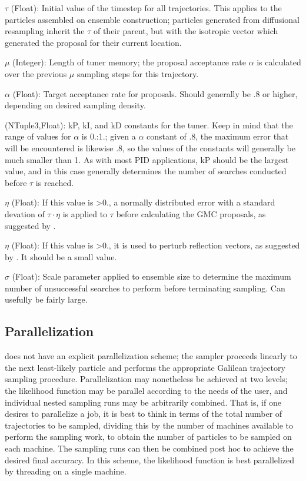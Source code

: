 $\tau$ (Float): Initial value of the timestep for all trajectories. This applies to the particles assembled on ensemble construction; particles generated from diffusional resampling inherit the $\tau$ of their parent, but with the isotropic vector which generated the proposal for their current location.

$\mu$ (Integer): Length of tuner memory; the proposal acceptance rate $\alpha$ is calculated over the previous $\mu$ sampling steps for this trajectory.

$\alpha$ (Float): Target acceptance rate for proposals. Should generally be .8 or higher, depending on desired sampling density.

 (NTuple{3,Float}): kP, kI, and kD constants for the tuner. Keep in  mind that the range of values for $\alpha$ is 0.:1.; given a $\alpha$ constant of .8, the maximum error that will be encountered is likewise .8, so the values of the constants will generally be much smaller than 1. As with most PID applications, kP should be the largest value, and in this case generally determines the number of searches conducted before $\tau$ is reached. 

$\eta$ (Float): If this value is >0., a normally distributed error with a standard devation of $\tau \cdot $$\eta$ is applied to $\tau$ before calculating the GMC proposals, as suggested by \cite{Skilling2012}.

$\eta$ (Float): If this value is >0., it is used to perturb reflection vectors, as suggested by \cite{Skilling2012}. It should be a small value.

$\sigma$ (Float): Scale parameter applied to ensemble size to determine the maximum number of unsuccessful searches to perform before terminating sampling. Can usefully be fairly large.

\subsection{Parallelization}
 does not have an explicit parallelization scheme; the sampler proceeds linearly to the next least-likely particle and performs the appropriate Galilean trajectory sampling procedure. Parallelization may nonetheless be achieved at two levels; the likelihood function may be parallel according to the needs of the user, and individual nested sampling runs may be arbitrarily combined. That is, if one desires to parallelize a  job, it is best to think in terms of the total number of trajectories to be sampled, dividing this by the number of machines available to perform the sampling work, to obtain the number of particles to be sampled on each machine. The sampling runs can then be combined post hoc to achieve the desired final accuracy. In this scheme, the likelihood function is best parallelized by threading on a single machine.


